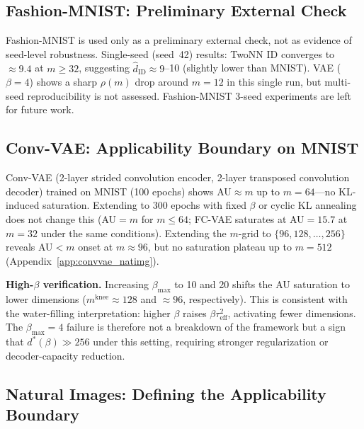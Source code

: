 \documentclass[make,article,submit,pdftex,moreauthors]{Definitions/mdpi}
\newcommand{\mknee}{m^{\mathrm{knee}}}
\newcommand{\hatdID}{\hat{d}_{\mathrm{ID}}}
\begin{document}
\subsection{Fashion-MNIST: Preliminary External Check}\label{sec:exp_fashion}

Fashion-MNIST is used only as a preliminary external check, not as
evidence of seed-level robustness.
Single-seed (seed~42) results: TwoNN ID converges to $\approx9.4$ at $m\geq32$,
suggesting $\hatdID\approx9$--10 (slightly lower than MNIST).
VAE ($\beta=4$) shows a sharp $\rho(m)$ drop around $m=12$ in this single run,
but multi-seed reproducibility is not assessed.
Fashion-MNIST 3-seed experiments are left for future work.

\subsection{Conv-VAE: Applicability Boundary on MNIST}\label{sec:exp_conv}

Conv-VAE (2-layer strided convolution encoder, 2-layer transposed convolution
decoder) trained on MNIST (100 epochs) shows AU$\approx m$ up to $m=64$---no
KL-induced saturation.
Extending to 300 epochs with fixed $\beta$ or cyclic KL annealing does not
change this (AU$=m$ for $m\leq64$; FC-VAE saturates at AU$=15.7$ at $m=32$
under the same conditions).
Extending the $m$-grid to $\{96,128,\ldots,256\}$ reveals AU$<m$ onset at
$m\approx96$, but no saturation plateau up to $m=512$ (Appendix~\ref{app:convvae_natimg}).

\textbf{High-$\beta$ verification.}
Increasing $\beta_{\max}$ to 10 and 20 shifts the AU saturation to lower
dimensions ($\mknee\approx128$ and $\approx96$, respectively).
This is consistent with the water-filling interpretation: higher $\beta$ raises
$\beta\tau^2_{\mathrm{eff}}$, activating fewer dimensions.
The $\beta_{\max}=4$ failure is therefore not a breakdown of the framework but
a sign that $d^*(\beta)\gg256$ under this setting, requiring stronger
regularization or decoder-capacity reduction.

\subsection{Natural Images: Defining the Applicability Boundary}\label{sec:exp_natural}
\end{document}
